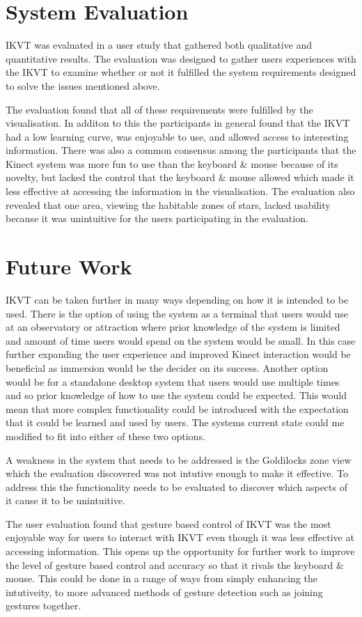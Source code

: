 \section{System Evaluation}
IKVT was evaluated in a user study that gathered both qualitative and quantitative
results. The evaluation was designed to gather users experiences with the IKVT
to examine whether or not it fulfilled the system requirements designed to solve
the issues mentioned above.

The evaluation found that all of these requirements were fulfilled by the
visualisation. In additon to this the participants in general found that the
IKVT had a low learning curve, was enjoyable to use, and allowed
access to interesting information. There was also a common consensus among the
participants that the Kinect system was more fun to use than the keyboard \&
mouse because of its novelty, but lacked the control that the
keyboard \& mouse allowed which made it less effective at accessing the
information in the visualisation. The evaluation also revealed that one area,
viewing the habitable zones of stars, lacked
usability because it was unintuitive for the users participating in the evaluation.     
\section{Future Work}
IKVT  can be taken further in many ways depending
on how it is intended to be used. There is the option of using the system as a
terminal that users would use at an observatory or attraction where prior
knowledge of the system is limited and amount of time users would spend on the
system would be small. In this case further expanding the user experience and
improved Kinect interaction would be beneficial as immersion would be the
decider on its success. Another option would be for a standalone
desktop system that users would use multiple times and so prior knowledge of how
to use the system could be expected. This would mean that more complex
functionality could be introduced with the expectation that it could be learned and used by
users. The systems current state could me modified to fit into either of these
two options.

A weakness in the system that needs to be addressed is the Goldilocks zone view
which the evaluation discovered was not intutive enough to make it effective. To
address this the functionality needs to be evaluated to discover which aspects
of it cause it to be unintuitive.

The user evaluation found that gesture based control of IKVT was the most
enjoyable way for users to interact with IKVT even though it was less effective
at accessing information. This opens up the opportunity for further work to
improve the level of gesture based control and accuracy so that it rivals the
keyboard \& mouse. This could be done in a range of ways from simply enhancing
the intutiveity, to more advanced methods of gesture detection such as joining gestures together.

